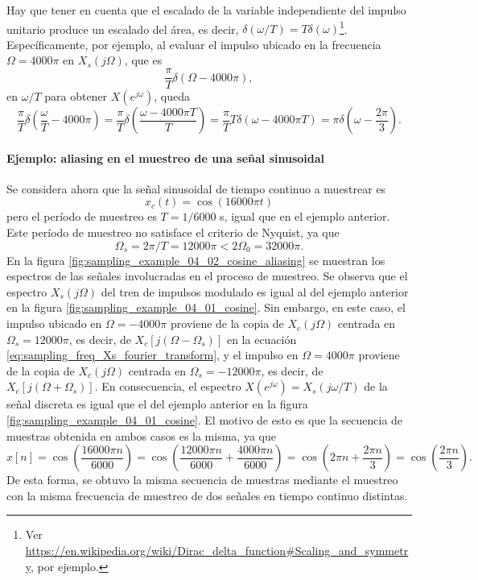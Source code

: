 \documentclass[a4paper]{report}
\begin{document}
Hay que tener en cuenta que el escalado de la variable independiente del impulso unitario produce un escalado del área, es decir, \(\delta(\omega/T)=T\delta(\omega)\)\footnote{Ver \url{https://en.wikipedia.org/wiki/Dirac_delta_function\#Scaling_and_symmetry}, por ejemplo.}. Específicamente, por ejemplo, al evaluar el impulso ubicado en la frecuencia \(\Omega=4000\pi\) en \(X_s(j\Omega)\), que es
\[
 \frac{\pi}{T}\delta(\Omega-4000\pi),
\]
en \(\omega/T\) para obtener \(X(e^{j\omega})\), queda
\[
 \frac{\pi}{T}\delta\left(\frac{\omega}{T}-4000\pi\right)
  =\frac{\pi}{T}\delta\left(\frac{\omega-4000\pi T}{T}\right)
  =\frac{\pi}{T}T\delta(\omega-4000\pi T)
  =\pi\delta\left(\omega-\frac{2\pi}{3}\right).
\]

\paragraph{Ejemplo: aliasing en el muestreo de una señal sinusoidal} Se considera ahora que la señal sinusoidal de tiempo continuo a muestrear es
\[
 x_c(t)=\cos(16000\pi t)
\]
pero el período de muestreo es \(T=1/6000\) s, igual que en el ejemplo anterior. Este período de muestreo no satisface el criterio de Nyquist, ya que
\[
 \Omega_s=2\pi/T=12000\pi<2\Omega_0=32000\pi.
\]
En la figura \ref{fig:sampling_example_04_02_cosine_aliasing} se muestran los espectros de las señales involucradas en el proceso de muestreo. Se observa que el espectro \(X_s(j\Omega)\) del tren de impulsos modulado es igual al del ejemplo anterior en la figura \ref{fig:sampling_example_04_01_cosine}. Sin embargo, en este caso, el impulso ubicado en \(\Omega=-4000\pi\) proviene de la copia de \(X_c(j\Omega)\) centrada en \(\Omega_s=12000\pi\), es decir, de \(X_c[j(\Omega-\Omega_s)]\) en la ecuación \ref{eq:sampling_freq_Xs_fourier_transform}, y el impulso en \(\Omega=4000\pi\) proviene de la copia de \(X_c(j\Omega)\) centrada en \(\Omega_s=-12000\pi\), es decir, de \(X_c[j(\Omega+\Omega_s)]\). En consecuencia, el espectro \(X(e^{j\omega})=X_s(j\omega/T)\) de la señal discreta es igual que el del ejemplo anterior en la figura \ref{fig:sampling_example_04_01_cosine}. El motivo de esto es que la secuencia de muestras obtenida en ambos casos es la misma, ya que 
\[
 x[n]=\cos\left(\frac{16000\pi n}{6000}\right)=\cos\left(\frac{12000\pi n}{6000}+\frac{4000\pi n}{6000}\right)
  =\cos\left(2\pi n+\frac{2\pi n}{3}\right)=\cos\left(\frac{2\pi n}{3}\right).
\]
De esta forma, se obtuvo la misma secuencia de muestras mediante el muestreo con la misma frecuencia de muestreo de dos señales en tiempo continuo distintas. 
\end{document}
